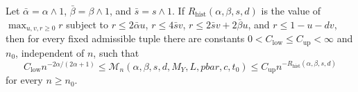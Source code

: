 Let \(\bar\alpha=\alpha\wedge1\), \(\bar\beta=\beta\wedge1\), and \(\bar s=s\wedge1\). If \(R_{\mathrm{hist}}(\alpha,\beta,s,d)\) is the value of \(\max_{u,v,r\ge0}r\) subject to \(r\le2\bar\alpha u\), \(r\le4\bar s v\), \(r\le2\bar s v+2\bar\beta u\), and \(r\le1-u-dv\), then for every fixed admissible tuple there are constants \(0<C_{\mathrm{low}}\le C_{\mathrm{up}}<\infty\) and \(n_0\), independent of \(n\), such that \[C_{\mathrm{low}}n^{-2\alpha/(2\alpha+1)}\le\mathcal M_n(\alpha,\beta,s,d,M_Y,L,pbar,c,t_0)\le C_{\mathrm{up}}n^{-R_{\mathrm{hist}}(\alpha,\beta,s,d)}\] for every \(n\ge n_0\).